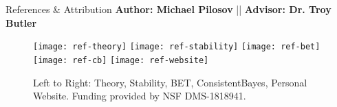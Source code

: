   \begin{block}{References \& Attribution}
    \centering
    \textbf{Author: Michael Pilosov} || \textbf{Advisor: Dr. Troy Butler}
    \begin{figure}
        \texttt{[image: ref-theory]}
        \texttt{[image: ref-stability]}
        \texttt{[image: ref-bet]}
        \texttt{[image: ref-cb]}
        \texttt{[image: ref-website]}
    \caption*{\centering Left to Right: Theory, Stability, BET, ConsistentBayes, Personal Website. \newline Funding provided by NSF DMS-1818941.}
    \end{figure}
   

  

  \end{block}

